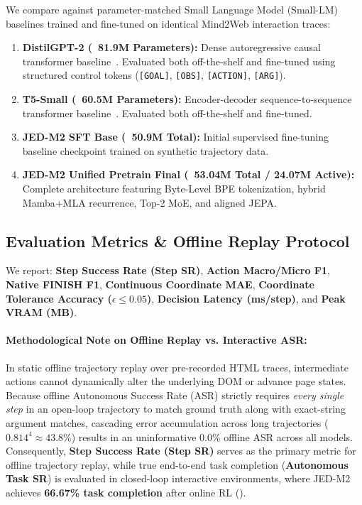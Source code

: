 \documentclass[10pt,twocolumn,letterpaper]{article}
\begin{document}
We compare against parameter-matched Small Language Model (Small-LM) baselines trained and fine-tuned on identical Mind2Web interaction traces:
\begin{enumerate}[leftmargin=*]
    \item \textbf{DistilGPT-2 (~81.9M Parameters):} Dense autoregressive causal transformer baseline~\cite{sanh2019distilbert}. Evaluated both off-the-shelf and fine-tuned using structured control tokens (\texttt{[GOAL]}, \texttt{[OBS]}, \texttt{[ACTION]}, \texttt{[ARG]}).
    \item \textbf{T5-Small (~60.5M Parameters):} Encoder-decoder sequence-to-sequence transformer baseline~\cite{raffel2020t5}. Evaluated both off-the-shelf and fine-tuned.
    \item \textbf{JED-M2 SFT Base (~50.9M Total):} Initial supervised fine-tuning baseline checkpoint trained on synthetic trajectory data.
    \item \textbf{JED-M2 Unified Pretrain Final (~53.04M Total / 24.07M Active):} Complete architecture featuring Byte-Level BPE tokenization, hybrid Mamba+MLA recurrence, Top-2 MoE, and aligned JEPA.
\end{enumerate}

\subsection{Evaluation Metrics \& Offline Replay Protocol}

We report: \textbf{Step Success Rate (Step SR)}, \textbf{Action Macro/Micro F1}, \textbf{Native FINISH F1}, \textbf{Continuous Coordinate MAE}, \textbf{Coordinate Tolerance Accuracy ($\epsilon \le 0.05$)}, \textbf{Decision Latency (ms/step)}, and \textbf{Peak VRAM (MB)}.

\paragraph{Methodological Note on Offline Replay vs. Interactive ASR:} In static offline trajectory replay over pre-recorded HTML traces, intermediate actions cannot dynamically alter the underlying DOM or advance page states. Because offline Autonomous Success Rate (ASR) strictly requires \textit{every single step} in an open-loop trajectory to match ground truth along with exact-string argument matches, cascading error accumulation across long trajectories ($0.814^4 \approx 43.8\%$) results in an uninformative 0.0\% offline ASR across all models. Consequently, \textbf{Step Success Rate (Step SR)} serves as the primary metric for offline trajectory replay, while true end-to-end task completion (\textbf{Autonomous Task SR}) is evaluated in closed-loop interactive environments, where JED-M2 achieves \textbf{66.67\% task completion} after online RL ().
\end{document}
